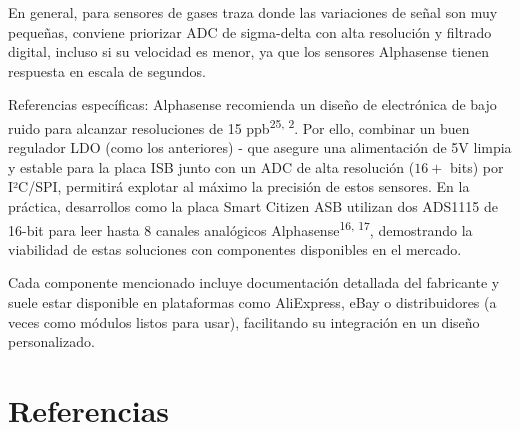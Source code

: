 \documentclass[a4paper, 12pt]{article}
\begin{document}
En general, para sensores de gases traza donde las variaciones de señal son muy pequeñas, conviene priorizar ADC de sigma-delta con alta resolución y filtrado digital, incluso si su velocidad es menor, ya que los sensores Alphasense tienen respuesta en escala de segundos.

Referencias específicas: Alphasense recomienda un diseño de electrónica de bajo ruido para alcanzar resoluciones de 15 ppb\textsuperscript{25, 2}. Por ello, combinar un buen regulador LDO (como los anteriores) - que asegure una alimentación de 5V limpia y estable para la placa ISB junto con un ADC de alta resolución ($16+$ bits) por I²C/SPI, permitirá explotar al máximo la precisión de estos sensores. En la práctica, desarrollos como la placa Smart Citizen ASB utilizan dos ADS1115 de 16-bit para leer hasta 8 canales analógicos Alphasense\textsuperscript{16, 17}, demostrando la viabilidad de estas soluciones con componentes disponibles en el mercado.

Cada componente mencionado incluye documentación detallada del fabricante y suele estar disponible en plataformas como AliExpress, eBay o distribuidores (a veces como módulos listos para usar), facilitando su integración en un diseño personalizado.

\section*{Referencias}
\end{document}
